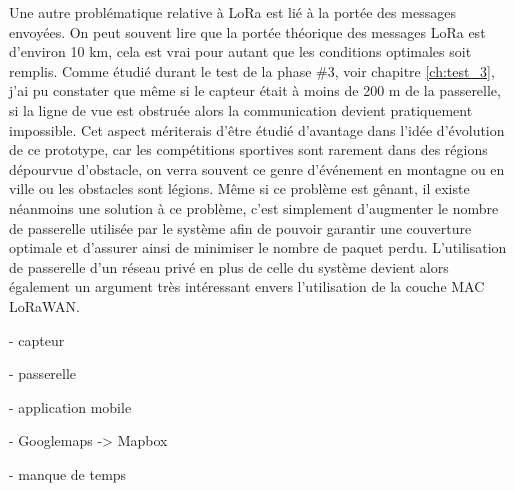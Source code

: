 Une autre problématique relative à LoRa est lié à la portée des messages envoyées. On peut souvent lire que la portée théorique des messages LoRa est d'environ 10 km, cela est vrai pour autant que les conditions optimales soit remplis. Comme étudié durant le test de la phase \#3, voir chapitre \ref{ch:test_3}, j'ai pu constater que même si le capteur était à moins de 200 m de la passerelle, si la ligne de vue est obstruée alors la communication devient pratiquement impossible. Cet aspect mériterais d'être étudié d'avantage dans l'idée d'évolution de ce prototype, car les compétitions sportives sont rarement dans des régions dépourvue d'obstacle, on verra souvent ce genre d'événement en montagne ou en ville ou les obstacles sont légions. Même si ce problème est gênant, il existe néanmoins une solution à ce problème, c'est simplement d'augmenter le nombre de passerelle utilisée par le système afin de pouvoir garantir une couverture optimale et d'assurer ainsi de minimiser le nombre de paquet perdu. L'utilisation de passerelle d'un réseau privé en plus de celle du système devient alors également un argument très intéressant envers l'utilisation de la couche MAC LoRaWAN.

 








- capteur

- passerelle

- application mobile

- Googlemaps -> Mapbox

- manque de temps